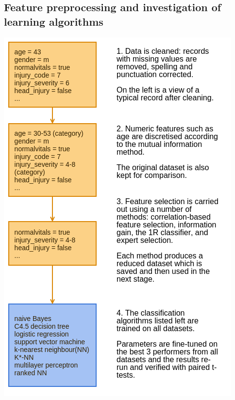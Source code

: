 \documentclass[portrait]{usydposter}
\begin{document}
\begin{multicols}{3}
\subsection{Feature preprocessing and investigation of learning algorithms}
\begin{center}
\includegraphics[scale=0.75]{approach}
\end{center}


\end{multicols}
\end{document}
